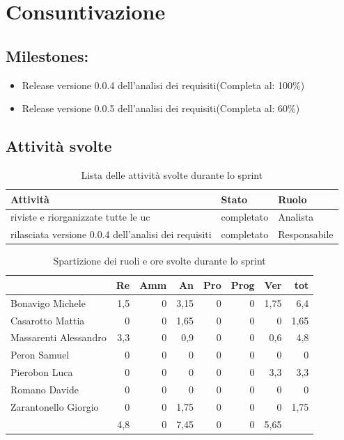 \section{Consuntivazione}

\subsection{Milestones:}
\begin{itemize}
    \item Release versione 0.0.4 dell'analisi dei requisiti(Completa al: 100\%)
    \item Release versione 0.0.5 dell'analisi dei requisiti(Completa al: 60\%)
\end{itemize}

\subsection{Attività svolte}

\begin{table}[H]
    \begin{xltabular}{\textwidth}{X l l}
        
         \textbf{Attività} & \textbf{Stato} & \textbf{Ruolo}\\
        \endhead
        \hline
        riviste e riorganizzate tutte le uc & completato & Analista \\
        rilasciata versione 0.0.4 dell'analisi dei requisiti & completato & Responsabile \\
    \end{xltabular}
    \caption{Lista delle attività svolte durante lo sprint}
\end{table}


\begin{table}[ht]
    \begin{tabularx}{\linewidth}{X|rrrrrrr}
    \rowcolor{gray!30}& Re & Amm & An & Pro & Prog & Ver & tot \\
    \hline
    Bonavigo Michele                        & 1,5 & 0 & 3,15 & 0 & 0 & 1,75  & 6,4 \\
    \rowcolor{gray!10}Casarotto Mattia      & 0 & 0 & 1,65 & 0 & 0 & 0 & 1,65 \\
    Massarenti Alessandro                   & 3,3 & 0 & 0,9 & 0 & 0 & 0,6  & 4,8 \\
    \rowcolor{gray!10}Peron Samuel          & 0 & 0 & 0 & 0 & 0 & 0 & 0 \\
    Pierobon Luca                           & 0 & 0 & 0 & 0 & 0 & 3,3 & 3,3 \\
    \rowcolor{gray!10}Romano Davide         & 0 & 0 & 0 & 0 & 0 & 0 & 0 \\
    Zarantonello Giorgio                    & 0 & 0 & 1,75 & 0 & 0 & 0 & 1,75 \\
    \hline                                  & 4,8 & 0 & 7,45 & 0 & 0 & 5,65 & \\
    \end{tabularx}
    \caption{\label{ruoli-persone}Spartizione dei ruoli e ore svolte durante lo sprint}
\end{table}

